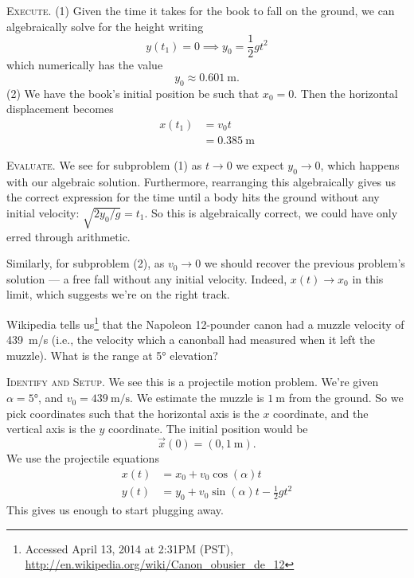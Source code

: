 \textsc{Execute.} (1) Given the time it takes for the book to fall on the
ground, we can algebraically solve for the height writing
\begin{equation}
y(t_{1})=0\implies y_{0}=\frac{1}{2}gt^{2}
\end{equation}
which numerically has the value
\begin{equation}
y_{0}\approx \SI{0.601}{\meter}.
\end{equation}
(2) We have the book's initial position be such that $x_{0}=0$. Then the
horizontal displacement becomes
\begin{equation}
\begin{split}
x(t_{1}) &= v_{0}t\\
&= \SI{0.385}{\meter}
\end{split}
\end{equation}

\textsc{Evaluate.}
We see for subproblem (1) as $t\to0$ we expect $y_{0}\to0$, which
happens with our algebraic solution. Furthermore, rearranging this
algebraically gives us the correct expression for the time until a body
hits the ground without any initial velocity:
$\sqrt{2y_{0}/g}=t_{1}$. So this is algebraically correct, we could have
only erred through arithmetic.

Similarly, for subproblem (2), as $v_{0}\to0$ we should recover the
previous problem's solution --- a free fall without any initial
velocity. Indeed, $x(t)\to x_0$ in this limit, which suggests we're on
the right track.


Wikipedia tells us\footnote{Accessed April 13, 2014 at 2:31PM (PST), \url{http://en.wikipedia.org/wiki/Canon_obusier_de_12}}
that the Napoleon 12-pounder canon had a muzzle velocity of
\SI{439}{\meter/\second} (i.e., the velocity which a canonball had
measured when it left the muzzle). What is the range at \ang{5} elevation?

\textsc{Identify and Setup.} We see this is a projectile motion
problem. We're given $\alpha=\ang{5}$, and
$v_{0}=\SI{439}{\meter/\second}$. We estimate the muzzle is
$\SI{1}{\meter}$ from the ground. So we pick coordinates such that the
horizontal axis is the $x$ coordinate, and the vertical axis is the $y$
coordinate. The initial position would be
\begin{equation}
\vec{x}(0)=(0,\SI{1}{\meter}).
\end{equation}
We use the projectile equations
\begin{equation*}
\begin{split}
x(t) &= x_{0} + v_{0}\cos(\alpha)t\\
y(t) &= y_{0} + v_{0}\sin(\alpha)t - \frac{1}{2}gt^{2}
\end{split}
\end{equation*}
This gives us enough to start plugging away.

